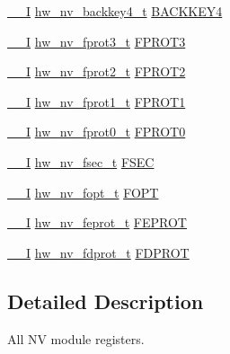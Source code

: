 \begin{DoxyCompactItemize}
\item 
\hyperlink{core__sc300_8h_af63697ed9952cc71e1225efe205f6cd3}{\+\_\+\+\_\+I} \hyperlink{union__hw__nv__backkey4}{hw\+\_\+nv\+\_\+backkey4\+\_\+t} \hyperlink{struct__hw__nv_afd953f751c993bd8c40e3925acc8d15f}{B\+A\+C\+K\+K\+E\+Y4}
\item 
\hyperlink{core__sc300_8h_af63697ed9952cc71e1225efe205f6cd3}{\+\_\+\+\_\+I} \hyperlink{union__hw__nv__fprot3}{hw\+\_\+nv\+\_\+fprot3\+\_\+t} \hyperlink{struct__hw__nv_aac4b392614cf656aa6df868cfb145360}{F\+P\+R\+O\+T3}
\item 
\hyperlink{core__sc300_8h_af63697ed9952cc71e1225efe205f6cd3}{\+\_\+\+\_\+I} \hyperlink{union__hw__nv__fprot2}{hw\+\_\+nv\+\_\+fprot2\+\_\+t} \hyperlink{struct__hw__nv_ad21a9c16923e734ef0df3bc50db9f8f2}{F\+P\+R\+O\+T2}
\item 
\hyperlink{core__sc300_8h_af63697ed9952cc71e1225efe205f6cd3}{\+\_\+\+\_\+I} \hyperlink{union__hw__nv__fprot1}{hw\+\_\+nv\+\_\+fprot1\+\_\+t} \hyperlink{struct__hw__nv_a3680dcb78d98d5d3177feafd381081c6}{F\+P\+R\+O\+T1}
\item 
\hyperlink{core__sc300_8h_af63697ed9952cc71e1225efe205f6cd3}{\+\_\+\+\_\+I} \hyperlink{union__hw__nv__fprot0}{hw\+\_\+nv\+\_\+fprot0\+\_\+t} \hyperlink{struct__hw__nv_afcb5adfe8d5091225cae0e58f4b0402d}{F\+P\+R\+O\+T0}
\item 
\hyperlink{core__sc300_8h_af63697ed9952cc71e1225efe205f6cd3}{\+\_\+\+\_\+I} \hyperlink{union__hw__nv__fsec}{hw\+\_\+nv\+\_\+fsec\+\_\+t} \hyperlink{struct__hw__nv_a25e028222bc59182b5c0d1e035cf9e86}{F\+S\+EC}
\item 
\hyperlink{core__sc300_8h_af63697ed9952cc71e1225efe205f6cd3}{\+\_\+\+\_\+I} \hyperlink{union__hw__nv__fopt}{hw\+\_\+nv\+\_\+fopt\+\_\+t} \hyperlink{struct__hw__nv_a4446ec001a4bbd283a2f169a800c9eb6}{F\+O\+PT}
\item 
\hyperlink{core__sc300_8h_af63697ed9952cc71e1225efe205f6cd3}{\+\_\+\+\_\+I} \hyperlink{union__hw__nv__feprot}{hw\+\_\+nv\+\_\+feprot\+\_\+t} \hyperlink{struct__hw__nv_ac83dbc60550e94220cd52c75b0edd5a6}{F\+E\+P\+R\+OT}
\item 
\hyperlink{core__sc300_8h_af63697ed9952cc71e1225efe205f6cd3}{\+\_\+\+\_\+I} \hyperlink{union__hw__nv__fdprot}{hw\+\_\+nv\+\_\+fdprot\+\_\+t} \hyperlink{struct__hw__nv_ad0c8d19dd4804bc970fdae2ccb6b2c8f}{F\+D\+P\+R\+OT}
\end{DoxyCompactItemize}


\subsection{Detailed Description}
All NV module registers. 

